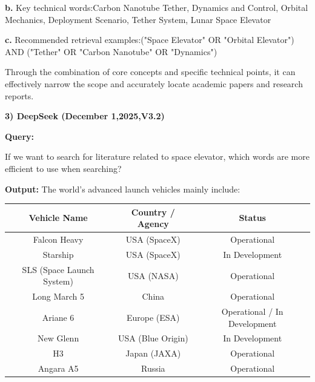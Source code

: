 \documentclass{article}
\begin{document}
\textbf{b.}	Key technical words:Carbon Nanotube Tether, Dynamics and Control, Orbital Mechanics, Deployment Scenario, Tether System, Lunar Space Elevator

\textbf{c.}	Recommended retrieval examples:("Space Elevator" OR "Orbital Elevator") AND ("Tether" OR "Carbon Nanotube" OR "Dynamics")

Through the combination of core concepts and specific technical points, it can effectively narrow the scope and accurately locate academic papers and research reports.


\textbf{3)	DeepSeek (December 1,2025,V3.2)}

\textbf{Query:}

If we want to search for literature related to space elevator, which words are more efficient to use when searching?

\textbf{Output:}
The world's advanced launch vehicles mainly include:

\begin{table}[htbp]
\centering
\label{tab:advanced_rockets}
\begin{tabular}{|c|c|c|}
\hline
\textbf{Vehicle Name} & \textbf{Country / Agency} & \textbf{Status} \\
\hline
Falcon Heavy & USA (SpaceX) & Operational \\
\hline
Starship & USA (SpaceX) & In Development \\
\hline
SLS (Space Launch System) & USA (NASA) & Operational \\
\hline
Long March 5 & China & Operational \\
\hline
Ariane 6 & Europe (ESA) & Operational / In Development \\
\hline
New Glenn & USA (Blue Origin) & In Development \\
\hline
H3 & Japan (JAXA) & Operational \\
\hline
Angara A5 & Russia & Operational \\
\hline
\end{tabular}
\end{table}
\end{document}
